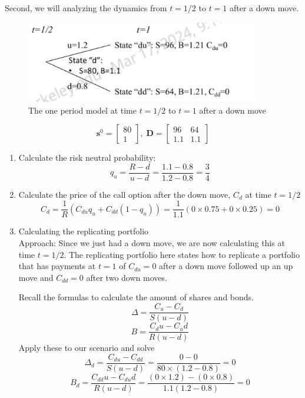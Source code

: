 \documentclass[11pt]{article}
\begin{document}
Second, we will analyzing the dynamics from $t=1/2$ to $t=1$ after a down move. 

\begin{figure}[H] 
    \centering 
    \includegraphics[width=4in]{imgs/two_period_two_state_bin_tree_model_down.jpeg}
    \caption{The one period model at time $t=1/2$ to $t=1$ after a down move}
\end{figure}

\[ 
    \boldsymbol{s}^0 = 
    \begin{bmatrix}
        80 \\ 
        1     
    \end{bmatrix}, \;
    \boldsymbol{D} = 
    \begin{bmatrix}
        96 & 64 \\
        1.1 & 1.1 
    \end{bmatrix}
\]

\begin{enumerate}
    \item Calculate the risk neutral probability:
    \[
      q_u = \frac{R-d}{u-d} = \frac{1.1-0.8}{1.2-0.8} = \frac{3}{4}   
    \]
    \item Calculate the price of the call option after the down move, $C_d$ at time $t=1/2$
    \[
      C_d = \frac{1}{R}(C_{du} q_u + C_{dd} (1-q_u))
      = \frac{1}{1.1} (0 \times 0.75 + 0 \times 0.25)  
      = 0
    \]
    \item Calculating the replicating portfolio \\
    Approach: Since we just had a down move, we are now calculating this at time $t=1/2$. The 
    replicating portfolio here states how to replicate a portfolio that has payments at $t=1$ of 
    $C_{du}=0$ after a down move followed up an up move and $C_{dd} = 0$ after two down moves.
    
    Recall the formulas to calculate the amount of shares and bonds.
    \[\Delta = \frac{C_u - C_d}{S (u-d)}\]
    \[B = \frac{C_d u- C_u d}{R(u-d)}\]
    Apply these to our scenario and solve
    \[
    \Delta_d = \frac{C_{du} - C_{dd}}{S (u-d)} 
    = \frac{0 - 0}{80 \times (1.2-0.8)}
    = 0
    \]
    \[
    B_d = \frac{C_{dd}u - C_{du} d}{R(u-d)}
    = \frac{(0 \times 1.2) - (0 \times 0.8)}{1.1(1.2-0.8)}
    = 0
    \]
\end{enumerate}
\end{document}
